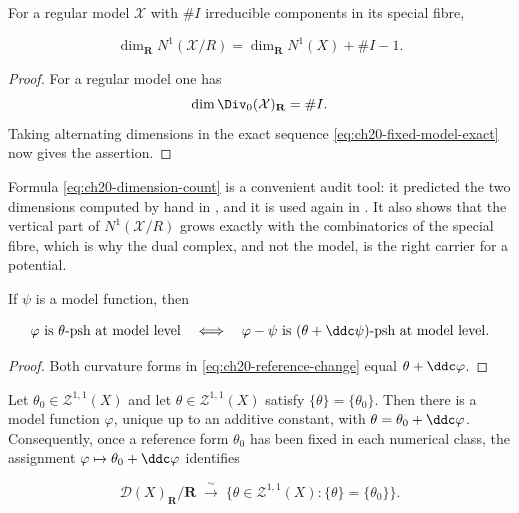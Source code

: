 \begin{corollary}
\label{cor:ch20-dimension-count}
For a regular model \(\mathcal X\) with \(\#I\) irreducible components in
its special fibre,

\begin{equation}
\label{eq:ch20-dimension-count}
 \dim_{\mathbf R}N^1(\mathcal X/R)
 =\dim_{\mathbf R}N^1(X)+\#I-1 .
\end{equation}
\end{corollary}

\begin{proof}
For a regular model one has
\[
 \dim\Div_0(\mathcal X)_{\mathbf R}=\#I.
\]
Taking alternating dimensions in the exact sequence
\eqref{eq:ch20-fixed-model-exact} now gives the assertion.
\end{proof}

Formula \eqref{eq:ch20-dimension-count} is a convenient audit tool: it
predicted the two dimensions computed by hand in
, and it is used again in
.  It also shows that the vertical part of
\(N^1(\mathcal X/R)\) grows exactly with the combinatorics of the special
fibre, which is why the dual complex, and not the model, is the right
carrier for a potential.

\begin{corollary}\label{cor:ch20-reference-change}
If \(\psi\) is a model function, then

\begin{equation}
\label{eq:ch20-reference-change}
 \varphi\text{ is \(\theta\)-psh at model level}
 \quad\Longleftrightarrow\quad
 \varphi-\psi\text{ is \((\theta+\ddc\psi)\)-psh at model level}.
\end{equation}
\end{corollary}

\begin{proof}
Both curvature forms in \eqref{eq:ch20-reference-change} equal
\(\theta+\ddc\varphi\).
\end{proof}

\begin{corollary}
\label{cor:ch20-normal-form}
Let \(\theta_0\in\mathcal Z^{1,1}(X)\) and let
\(\theta\in\mathcal Z^{1,1}(X)\) satisfy \(\{\theta\}=\{\theta_0\}\).  Then
there is a model function \(\varphi\), unique up to an additive constant,
with \(\theta=\theta_0+\ddc\varphi\).  Consequently, once a reference form
\(\theta_0\) has been fixed in each numerical class, the assignment
\(\varphi\mapsto\theta_0+\ddc\varphi\) identifies

\[
 \mathcal D(X)_{\mathbf R}/\mathbf R
 \;\xrightarrow{\ \sim\ }\;
 \{\theta\in\mathcal Z^{1,1}(X):\{\theta\}=\{\theta_0\}\}.
\]
\end{corollary}

